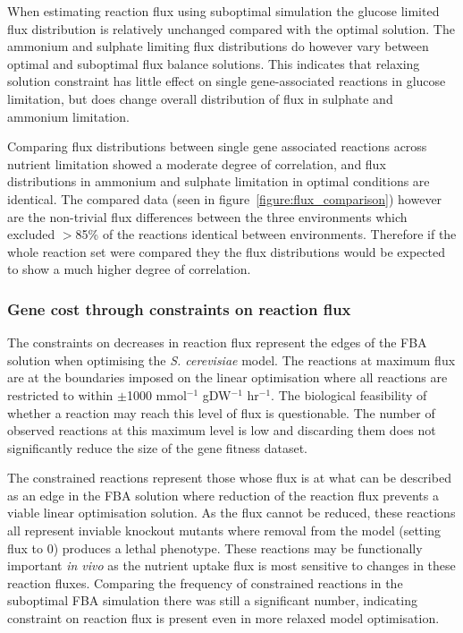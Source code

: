 When estimating reaction flux using suboptimal simulation the glucose limited flux distribution is relatively unchanged compared with the optimal solution. The ammonium and sulphate limiting flux distributions do however vary between optimal and suboptimal flux balance solutions. This indicates that relaxing solution constraint has little effect on single gene-associated reactions in glucose limitation, but does change overall distribution of flux in sulphate and ammonium limitation.

Comparing flux distributions between single gene associated reactions across nutrient limitation showed a moderate degree of correlation, and flux distributions in ammonium and sulphate limitation in optimal conditions are identical. The compared data (seen in figure~\vref{figure:flux_comparison}) however are the non-trivial flux differences between the three environments which excluded $>$85\% of the reactions identical between environments. Therefore if the whole reaction set were compared they the flux distributions would be expected to show a much higher degree of correlation.

\subsubsection{Gene cost through constraints on reaction flux}%

The constraints on decreases in reaction flux represent the edges of the FBA solution when optimising the \emph{S. cerevisiae} model. The reactions at maximum flux are at the boundaries imposed on the linear optimisation where all reactions are restricted to within $\pm$1000 mmol$^{-1}$ gDW$^{-1}$ hr$^{-1}$. The biological feasibility of whether a reaction may reach this level of flux is questionable.  The number of observed reactions at this maximum level is low and discarding them does not significantly reduce the size of the gene fitness dataset.

The constrained reactions represent those whose flux is at what can be described as an edge in the FBA solution where reduction of the reaction flux prevents a viable linear optimisation solution. As the flux cannot be reduced, these reactions all represent inviable knockout mutants where removal from the model (setting flux to 0) produces a lethal phenotype. These reactions may be functionally important \emph{in vivo} as the nutrient uptake flux is most sensitive to changes in these reaction fluxes. Comparing the frequency of constrained reactions in the suboptimal FBA simulation there was still a significant number, indicating constraint on reaction flux is present even in more relaxed model optimisation.

